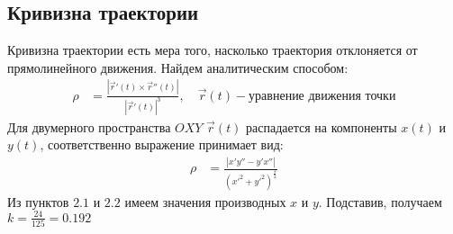 \subsection{Кривизна траектории}
Кривизна траектории есть мера того, насколько траектория отклоняется от
прямолинейного движения. Найдем аналитическим способом:
\begin{align}
    \rho &= \frac{\left|\vec{r}'(t)\times\vec{r}''(t)\right|}{\left|\vec{r}'(t)\right|^{3}},
    \quad\vec{r}(t) - \text{уравнение движения точки}
\end{align}
Для двумерного пространства $OXY$ $\vec{r}(t)$ распадается на компоненты $x(t)$ и $y(t)$,
соответственно выражение принимает вид:
\begin{align}
    \rho &= \frac{\left|x'y'' - y'x''\right|}{(x'^{2}+y'^{2})^{\frac{3}{2}}}
\end{align}
Из пунктов $2.1$ и $2.2$ имеем значения производных $x$ и $y$.
Подставив, получаем $k = \frac{24}{125} = 0.192$

